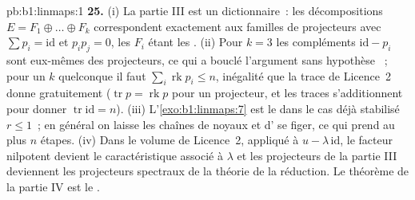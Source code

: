 \begin{solution}{pb:b1:linmaps:1}
\textbf{25.} (i) La partie III est un dictionnaire~: les décompositions $E = F_1
\oplus \dots \oplus F_k$ correspondent exactement aux familles de
projecteurs avec $\sum p_i = \mathrm{id}$ et $p_i p_j = 0$, les
$F_i$ étant les . (ii) Pour $k = 3$ les compléments
$\mathrm{id} - p_i$ sont eux-mêmes des projecteurs, ce qui a bouclé
l'argument sans hypothèse ~; pour un $k$ quelconque il faut
$\sum_i \operatorname{rk} p_i \leq n$, inégalité que la trace de
Licence~2 donne gratuitement ($\operatorname{tr} p = \operatorname{rk}
p$ pour un projecteur, et les traces s'additionnent pour donner $\operatorname{tr}
\mathrm{id} = n$). (iii) L'\cref{exo:b1:linmaps:7} est le  dans le cas déjà stabilisé $r \leq 1$~; en général on
laisse les chaînes de noyaux et d' se figer, ce qui prend au plus $n$
étapes. (iv) Dans le volume de Licence~2, appliqué à $u - \lambda\,
\mathrm{id}$, le facteur nilpotent devient le  caractéristique
associé à $\lambda$ et les projecteurs de la partie III deviennent
les projecteurs spectraux de la théorie de la réduction. Le théorème de
la partie IV est le \emph{}.
\end{solution}
